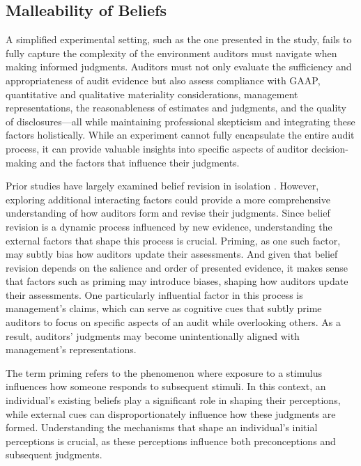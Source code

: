\documentclass[12pt,english]{article}
\begin{document}
\subsection{Malleability of Beliefs}
\hspace*{2em} A simplified experimental setting, such as the one presented in the \citet{ashton1988} study, fails to fully capture the complexity of the environment auditors must navigate when making informed judgments. Auditors must not only evaluate the sufficiency and appropriateness of audit evidence but also assess compliance with GAAP, quantitative and qualitative materiality considerations, management representations, the reasonableness of estimates and judgments, and the quality of disclosures—all while maintaining professional skepticism and integrating these factors holistically. While an experiment cannot fully encapsulate the entire audit process, it can provide valuable insights into specific aspects of auditor decision-making and the factors that influence their judgments. 

Prior studies have largely examined belief revision in isolation \citep{ashton1988, pei1992, kennedy1995}. However, exploring additional interacting factors could provide a more comprehensive understanding of how auditors form and revise their judgments. Since belief revision is a dynamic process influenced by new evidence, understanding the external factors that shape this process is crucial. Priming, as one such factor, may subtly bias how auditors update their assessments. And given that belief revision depends on the salience and order of presented evidence, it makes sense that factors such as priming may introduce biases, shaping how auditors update their assessments. One particularly influential factor in this process is management’s claims, which can serve as cognitive cues that subtly prime auditors to focus on specific aspects of an audit while overlooking others. As a result, auditors’ judgments may become unintentionally aligned with management’s representations.

The term priming refers to the phenomenon where exposure to a stimulus influences how someone responds to subsequent stimuli. In this context, an individual’s existing beliefs play a significant role in shaping their perceptions, while external cues can disproportionately influence how these judgments are formed. Understanding the mechanisms that shape an individual's initial perceptions is crucial, as these perceptions influence both preconceptions and subsequent judgments.
\end{document}

